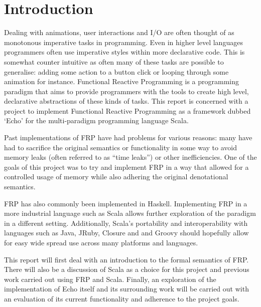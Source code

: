 \chapter{Introduction}

  Dealing with animations, user interactions and I/O are often thought of as monotonous imperative tasks
  in programming. Even in higher level languages programmers often use imperative
  styles within more declarative code. This is somewhat counter intuitive as often many of these tasks are possible to generalise: adding
  some action to a button click or looping through some animation for instance. Functional Reactive Programming
  is a programming paradigm that aims to provide programmers with the tools to create high level,
  declarative abstractions of these kinds of tasks. This report is concerned with a project to
  implement Functional Reactive Programming as a framework dubbed `Echo' \cite{Stott} for the multi-paradigm programming language
  Scala.

  Past implementations of FRP have had problems for various reasons: many have had to sacrifice the original semantics or functionality in some way to avoid
  memory leaks (often referred to as ``time leaks'') or other inefficiencies. One of the goals
  of this project was to try and implement FRP in a way that allowed for a controlled usage of memory while also
  adhering the original denotational semantics. 
  
  FRP
  has also commonly been implemented in Haskell. Implementing FRP in a more industrial language such as Scala allows
  further exploration of the paradigm in a different setting. Additionally, Scala's portability and interoperability with
  languages such as Java, JRuby, Closure and and Groovy should hopefully allow for easy wide spread use across many platforms and languages. 

  This report will first deal with an introduction to the formal semantics of FRP. There will also be a discussion of Scala as a 
  choice for this project and previous work carried out using FRP and Scala.
  Finally, an exploration of the implementation of Echo itself and its surrounding work will be carried out with an
  evaluation of its current functionality and adherence to the project goals.